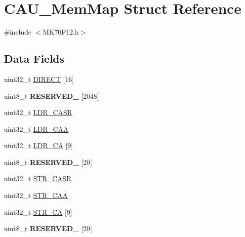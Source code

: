 \hypertarget{struct_c_a_u___mem_map}{}\section{C\+A\+U\+\_\+\+Mem\+Map Struct Reference}
\label{struct_c_a_u___mem_map}


{\ttfamily \#include $<$M\+K70\+F12.\+h$>$}

\subsection*{Data Fields}
\begin{DoxyCompactItemize}
\item 
uint32\+\_\+t \hyperlink{struct_c_a_u___mem_map_aedfa93977c4f622bd7bc6c223a02f9c2}{D\+I\+R\+E\+C\+T} \mbox{[}16\mbox{]}
\item 
\hypertarget{struct_c_a_u___mem_map_a57132ef8234ec29f1128507dcd5a5da9}{}uint8\+\_\+t {\bfseries R\+E\+S\+E\+R\+V\+E\+D\+\_} \mbox{[}2048\mbox{]}\label{struct_c_a_u___mem_map_a57132ef8234ec29f1128507dcd5a5da9}

\item 
uint32\+\_\+t \hyperlink{struct_c_a_u___mem_map_ae256965798409e23f35be1d69b7d4918}{L\+D\+R\+\_\+\+C\+A\+S\+R}
\item 
uint32\+\_\+t \hyperlink{struct_c_a_u___mem_map_aa1bd9997f3c316e126979eb1a249a53b}{L\+D\+R\+\_\+\+C\+A\+A}
\item 
uint32\+\_\+t \hyperlink{struct_c_a_u___mem_map_ad53398a7dd146307c3fc7aeb448a42b6}{L\+D\+R\+\_\+\+C\+A} \mbox{[}9\mbox{]}
\item 
\hypertarget{struct_c_a_u___mem_map_ab2c01b633e89743a7c6a3bcc1d9f50ce}{}uint8\+\_\+t {\bfseries R\+E\+S\+E\+R\+V\+E\+D\+\_} \mbox{[}20\mbox{]}\label{struct_c_a_u___mem_map_ab2c01b633e89743a7c6a3bcc1d9f50ce}

\item 
uint32\+\_\+t \hyperlink{struct_c_a_u___mem_map_ad90eef15bc61290af107c3d5871599a8}{S\+T\+R\+\_\+\+C\+A\+S\+R}
\item 
uint32\+\_\+t \hyperlink{struct_c_a_u___mem_map_aa67e4616f37a59b89df13691bf40f643}{S\+T\+R\+\_\+\+C\+A\+A}
\item 
uint32\+\_\+t \hyperlink{struct_c_a_u___mem_map_a52fa9a2cc14dede00bf01a39590a757d}{S\+T\+R\+\_\+\+C\+A} \mbox{[}9\mbox{]}
\item 
\hypertarget{struct_c_a_u___mem_map_a30ff812432b065b9691187c4d47f3b0f}{}uint8\+\_\+t {\bfseries R\+E\+S\+E\+R\+V\+E\+D\+\_} \mbox{[}20\mbox{]}\label{struct_c_a_u___mem_map_a30ff812432b065b9691187c4d47f3b0f}


\end{DoxyCompactItemize}
